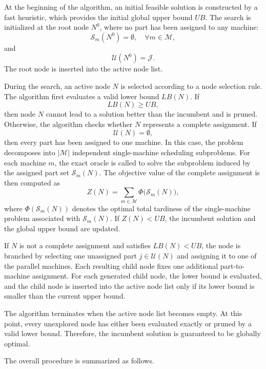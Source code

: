 \documentclass[letterpaper, 10 pt, conference]{ieeeconf}  %
\begin{document}
At the beginning of the algorithm, an initial feasible solution is
constructed by a fast heuristic, which provides the initial global upper
bound $UB$. The search is initialized at the root node $N^0$, where no part
has been assigned to any machine:
\[
\mathcal{S}_m(N^0)=\emptyset,\quad \forall m\in\mathcal{M},
\]
and
\[
\mathcal{U}(N^0)=\mathcal{J}.
\]
The root node is inserted into the active node list.

During the search, an active node $N$ is selected according to a node
selection rule. The algorithm first evaluates a valid lower bound $LB(N)$.
If
\[
LB(N)\ge UB,
\]
then node $N$ cannot lead to a solution better than the incumbent and is
pruned. Otherwise, the algorithm checks whether $N$ represents a complete
assignment. If
\[
\mathcal{U}(N)=\emptyset,
\]
then every part has been assigned to one machine. In this case, the problem
decomposes into $|\mathcal{M}|$ independent single-machine scheduling
subproblems. For each machine $m$, the exact oracle is called to solve the
subproblem induced by the assigned part set $\mathcal{S}_m(N)$. The objective
value of the complete assignment is then computed as
\[
Z(N)=\sum_{m\in\mathcal{M}}\Phi\bigl(\mathcal{S}_m(N)\bigr),
\]
where $\Phi(\mathcal{S}_m(N))$ denotes the optimal total tardiness of the
single-machine problem associated with $\mathcal{S}_m(N)$. If $Z(N)<UB$,
the incumbent solution and the global upper bound are updated.

If $N$ is not a complete assignment and satisfies $LB(N)<UB$, the node is
branched by selecting one unassigned part $j\in\mathcal{U}(N)$ and assigning
it to one of the parallel machines. Each resulting child node fixes one
additional part-to-machine assignment. For each generated child node, the
lower bound is evaluated, and the child node is inserted into the active
node list only if its lower bound is smaller than the current upper bound.

The algorithm terminates when the active node list becomes empty. At this
point, every unexplored node has either been evaluated exactly or pruned by
a valid lower bound. Therefore, the incumbent solution is guaranteed to be
globally optimal.

The overall procedure is summarized as follows.
\end{document}
